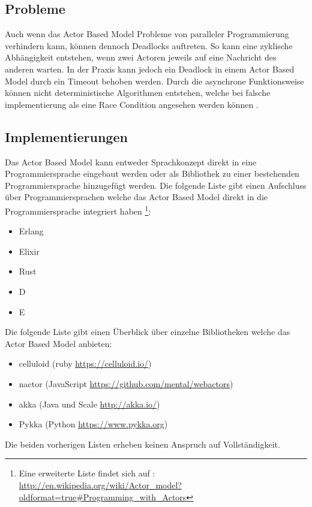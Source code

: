 \subsection{Probleme}
Auch wenn das Actor Based Model Probleme von paralleler Programmierung verhindern kann, können dennoch Deadlocks auftreten. So kann eine zyklische Abhängigkeit entstehen, wenn zwei Actoren jeweils auf eine Nachricht des anderen warten. In der Praxis kann jedoch ein Deadlock in einem Actor Based Model durch ein Timeout behoben werden. Durch die asynchrone Funktionsweise können nicht deterministische Algorithmen entstehen, welche bei falsche implementierung als eine Race Condition angesehen werden können \cite[]{Erb2012}. 

\subsection{Implementierungen}
Das Actor Based Model kann entweder Sprachkonzept direkt in eine Programmiersprache eingebaut werden oder als Bibliothek zu einer bestehenden Programmiersprache hinzugefügt werden. Die folgende Liste gibt einen Aufschluss über Programmiersprachen welche das Actor Based Model direkt in die Programmiersprache integriert haben \footnote{Eine erweiterte Liste findet sich auf  \cite[]{Erb2012}: \url{http://en.wikipedia.org/wiki/Actor_model?oldformat=true#Programming_with_Actors}}:

\begin{itemize}
  \item Erlang
  \item Elixir
  \item Rust
  \item D
  \item E
\end{itemize}

Die folgende Liste gibt einen Überblick über einzelne Bibliotheken welche das Actor Based Model anbieten:

\begin{itemize}
  \item celluloid (ruby \url{https://celluloid.io/})
  \item nactor (JavaScript \url{https://github.com/mental/webactors})
  \item akka (Java und Scale \url{http://akka.io/})
  \item Pykka (Python \url{https://www.pykka.org})
\end{itemize}

Die beiden vorherigen Listen erheben keinen Anspruch auf Vollständigkeit. 

